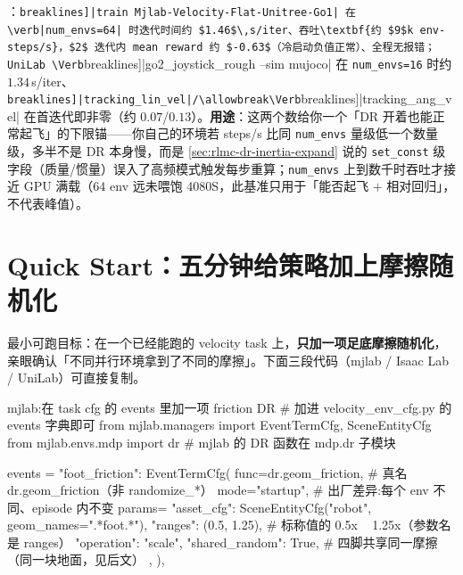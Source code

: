 \begin{finenote}
：\Verb[breaklines]|train Mjlab-Velocity-Flat-Unitree-Go1| 在 \verb|num_envs=64| 时迭代时间约 $1.46$\,s/iter、吞吐\textbf{约 $9$k env-steps/s}，$2$ 迭代内 mean reward 约 $-0.63$（冷启动负值正常）、全程无报错；UniLab \Verb[breaklines]|go2_joystick_rough --sim mujoco| 在 \verb|num_envs=16| 时约 $1.34$\,s/iter、\Verb[breaklines]|tracking_lin_vel|/\allowbreak\Verb[breaklines]|tracking_ang_vel| 在首迭代即非零（约 $0.07$/$0.13$）。\textbf{用途}：这两个数给你一个「DR 开着也能正常起飞」的下限锚——你自己的环境若 steps/s 比同 \verb|num_envs| 量级低一个数量级，多半不是 DR 本身慢，而是 \cref{sec:rlmc-dr-inertia-expand} 说的 \verb|set_const| 级字段（质量/惯量）误入了高频模式触发每步重算；\verb|num_envs| 上到数千时吞吐才接近 GPU 满载（$64$ env 远未喂饱 4080S，此基准只用于「能否起飞 $+$ 相对回归」，不代表峰值）。
\end{finenote}

\section*{Quick Start：五分钟给策略加上摩擦随机化}
\label{sec:rlmc-dr-quickstart}

最小可跑目标：在一个已经能跑的 velocity task 上，\textbf{只加一项足底摩擦随机化}，亲眼确认「不同并行环境拿到了不同的摩擦」。下面三段代码（mjlab / Isaac Lab / UniLab）可直接复制。

\begin{codebox}[Python]{mjlab:在 task cfg 的 events 里加一项 friction DR}
# 加进 velocity_env_cfg.py 的 events 字典即可
from mjlab.managers import EventTermCfg, SceneEntityCfg
from mjlab.envs.mdp import dr                # mjlab 的 DR 函数在 mdp.dr 子模块

events = {
    "foot_friction": EventTermCfg(
        func=dr.geom_friction,                # 真名 dr.geom_friction（非 randomize_*）
        mode="startup",                       # 出厂差异:每个 env 不同、episode 内不变
        params={
            "asset_cfg": SceneEntityCfg("robot", geom_names=".*foot.*"),
            "ranges": (0.5, 1.25),            # 标称值的 0.5x ~ 1.25x（参数名是 ranges）
            "operation": "scale",
            "shared_random": True,            # 四脚共享同一摩擦（同一块地面，见后文）
        },
    ),
}
\end{codebox}

